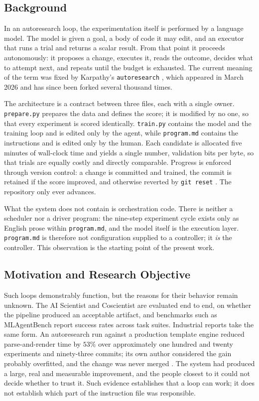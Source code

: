 \documentclass[11pt]{article}
\begin{document}
\subsection{Background}

In an autoresearch loop, the experimentation itself is performed by a language model. The model is given a goal, a body of code it may edit, and an executor that runs a trial and returns a scalar result. From that point it proceeds autonomously: it proposes a change, executes it, reads the outcome, decides what to attempt next, and repeats until the budget is exhausted. The current meaning of the term was fixed by Karpathy's \texttt{autoresearch} \cite{Karpathy2026autoresearch}, which appeared in March 2026 and has since been forked several thousand times.

The architecture is a contract between three files, each with a single owner. \texttt{prepare.py} prepares the data and defines the score; it is modified by no one, so that every experiment is scored identically. \texttt{train.py} contains the model and the training loop and is edited only by the agent, while \texttt{program.md} contains the instructions and is edited only by the human. Each candidate is allocated five minutes of wall-clock time and yields a single number, validation bits per byte, so that trials are equally costly and directly comparable. Progress is enforced through version control: a change is committed and trained, the commit is retained if the score improved, and otherwise reverted by \texttt{git reset} \cite{Tuychiev2026guide}. The repository only ever advances.

What the system does not contain is orchestration code. There is neither a scheduler nor a driver program: the nine-step experiment cycle exists only as English prose within \texttt{program.md}, and the model itself is the execution layer. \texttt{program.md} is therefore not configuration supplied to a controller; it \emph{is} the controller. This observation is the starting point of the present work.

\subsection{Motivation and Research Objective}

Such loops demonstrably function, but the reasons for their behavior remain unknown. The AI Scientist \cite{Lu2024aiscientist} and Coscientist \cite{Boiko2023coscientist} are evaluated end to end, on whether the pipeline produced an acceptable artifact, and benchmarks such as MLAgentBench \cite{Huang2024mlagentbench} report success rates across task suites. Industrial reports take the same form. An autoresearch run against a production template engine reduced parse-and-render time by $53\%$ over approximately one hundred and twenty experiments and ninety-three commits; its own author considered the gain probably overfitted, and the change was never merged \cite{Lutke2026liquid}. The system had produced a large, real and measurable improvement, and the people closest to it could not decide whether to trust it. Such evidence establishes that a loop can work; it does not establish which part of the instruction file was responsible.
\end{document}
